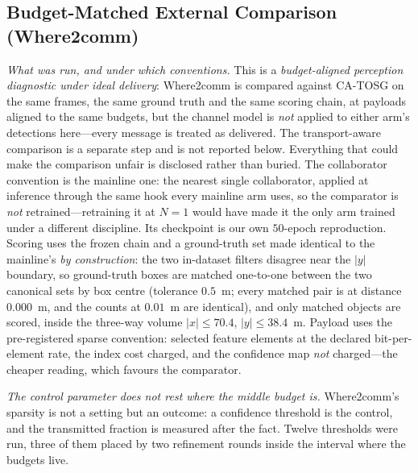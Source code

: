 \documentclass[journal]{IEEEtran}
\newcommand{\method}{CA-TOSG}
\begin{document}
\subsection{Budget-Matched External Comparison (Where2comm)}\label{sec:where2comm}

\emph{What was run, and under which conventions.} This is a \emph{budget-aligned perception
diagnostic under ideal delivery}: Where2comm is compared against \method{} on the same frames, the
same ground truth and the same scoring chain, at payloads aligned to the same budgets, but the
channel model is \emph{not} applied to either arm's detections here---every message is treated as
delivered. The transport-aware comparison is a separate step and is not reported below. Everything
that could make the comparison unfair is disclosed rather than buried. The collaborator convention is the mainline one: the nearest single
collaborator, applied at inference through the same hook every mainline arm uses, so the comparator
is \emph{not} retrained---retraining it at $N=1$ would have made it the only arm trained under a
different discipline. Its checkpoint is our own $50$-epoch reproduction. Scoring uses the frozen
chain and a ground-truth set made identical to the mainline's \emph{by construction}: the two
in-dataset filters disagree near the $|y|$ boundary, so ground-truth boxes are matched one-to-one
between the two canonical sets by box centre (tolerance $0.5$~m; every matched pair is at distance
$0.000$~m, and the counts at $0.01$~m are identical), and only matched objects are scored, inside the
three-way volume $|x|\le70.4$, $|y|\le38.4$~m. Payload uses the pre-registered sparse convention:
selected feature elements at the declared bit-per-element rate, the index cost charged, and the
confidence map \emph{not} charged---the cheaper reading, which favours the comparator.

\emph{The control parameter does not rest where the middle budget is.} Where2comm's sparsity is not
a setting but an outcome: a confidence threshold is the control, and the transmitted fraction is
measured after the fact. Twelve thresholds were run, three of them placed by two refinement rounds
inside the interval where the budgets live.
\end{document}
